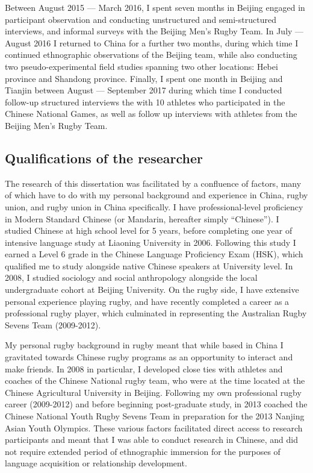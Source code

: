 Between August 2015 --- March 2016, I spent seven months in Beijing engaged in participant observation and conducting unstructured and semi-structured interviews, and informal surveys with the Beijing Men's Rugby Team. In July --- August 2016 I returned to China for a further two months, during which time I continued ethnographic observations of the Beijing team, while also conducting two pseudo-experimental field studies spanning two other locations: Hebei province and Shandong province. Finally, I spent one month in Beijing and Tianjin between August --- September 2017 during which time I conducted follow-up structured interviews the with 10 athletes who participated in the Chinese National Games, as well as follow up interviews with athletes from the Beijing Men's Rugby Team.

\subsection{Qualifications of the researcher}
The research of this dissertation was facilitated by a confluence of factors, many of which have to do with my personal background and experience in China, rugby union, and rugby union in China specifically.  I have professional-level proficiency in Modern Standard Chinese (or Mandarin, hereafter simply ``Chinese'').  I studied Chinese at high school level for 5 years, before completing one year of intensive language study at Liaoning University in 2006.  Following this study I earned a Level 6 grade in the Chinese Language Proficiency Exam (HSK), which qualified me to study alongside native Chinese speakers at University level.  In 2008, I studied sociology and social anthropology alongside the local undergraduate cohort at Beijing University.  On the rugby side, I have extensive personal experience playing rugby, and have recently completed a career as a professional rugby player, which culminated in representing the Australian Rugby Sevens Team (2009-2012).

My personal rugby background in rugby meant that while based in China I gravitated towards Chinese rugby programs as an opportunity to interact and make friends. In 2008 in particular, I developed close ties with athletes and coaches of the Chinese National rugby team, who were at the time located at the Chinese Agricultural University in Beijing.  Following my own professional rugby career (2009-2012) and before beginning post-graduate study, in 2013 coached the Chinese National Youth Rugby Sevens Team in preparation for the 2013 Nanjing Asian Youth Olympics.  These various factors facilitated direct access to research participants and meant that I was able to conduct research in Chinese, and did not require extended period of ethnographic immersion for the purposes of language acquisition or relationship development.

